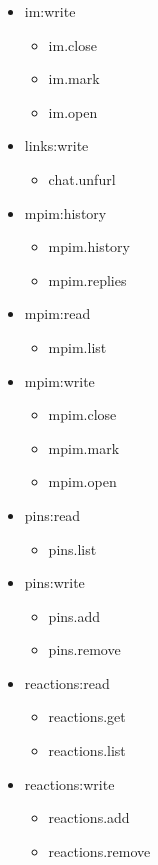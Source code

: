 \begin{multicols}{2}
\begin{itemize}
	\item im:write
	\begin{itemize}
		\item im.close
		\item im.mark
		\item im.open
	\end{itemize}
	
	\item links:write
	\begin{itemize}
		\item chat.unfurl
	\end{itemize}
	
	\item mpim:history
	\begin{itemize}
		\item mpim.history
		\item mpim.replies
	\end{itemize}
	
	\item mpim:read
	\begin{itemize}
		\item mpim.list
	\end{itemize}
	
	\item mpim:write
	\begin{itemize}
		\item mpim.close
		\item mpim.mark
		\item mpim.open
	\end{itemize}
	
	\item pins:read
	\begin{itemize}
		\item pins.list
	\end{itemize}
	
	\item pins:write
	\begin{itemize}
		\item pins.add
		\item pins.remove
	\end{itemize}
	
	\item reactions:read
	\begin{itemize}
		\item reactions.get
		\item reactions.list
	\end{itemize}
	
	\item reactions:write
	\begin{itemize}
		\item reactions.add
		\item reactions.remove
	\end{itemize}
	

\end{itemize}
\end{multicols}
